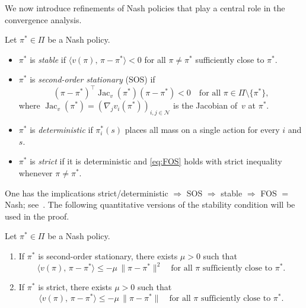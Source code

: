 \documentclass[a4paper,oneside,11pt]{report}
\newcommand{\calN}{\mathcal{N}}
\newcommand{\ip}[2]{\langle #1,\, #2 \rangle}
\newcommand{\norm}[1]{\| #1 \|}
\numberwithin{theorem}{chapter}
\numberwithin{equation}{chapter}
\begin{document}
We now introduce refinements of Nash policies that play a central role
in the convergence analysis.

\begin{definition}
  \label{def:refinements}
  Let $\pi^* \in \Pi$ be a Nash policy.
  \begin{itemize}
  \item $\pi^*$ is \emph{stable} if
    $\ip{v(\pi)}{\pi - \pi^*} < 0$ for all
    $\pi \ne \pi^*$ sufficiently close to $\pi^*$.
  \item $\pi^*$ is \emph{second-order stationary} (SOS) if
    \begin{equation}
      \label{eq:SOS}
      (\pi - \pi^*)^\top \operatorname{Jac}_v(\pi^*)(\pi - \pi^*) < 0
      \quad \text{for all } \pi \in \Pi \setminus \{\pi^*\},
      \tag{SOS}
    \end{equation}
    where
    $\operatorname{Jac}_v(\pi^*) = (\nabla_j v_i(\pi^*))_{i,j \in
      \calN}$ is the Jacobian of~$v$ at $\pi^*$.
  \item $\pi^*$ is \emph{deterministic} if $\pi^*_i(s)$ places all
    mass on a single action for every $i$ and $s$.
  \item $\pi^*$ is \emph{strict} if it is deterministic and
    \eqref{eq:FOS} holds with strict inequality whenever
    $\pi \ne \pi^*$.
  \end{itemize}
\end{definition}

One has the implications
strict/deterministic $\Longrightarrow$ SOS $\Longrightarrow$ stable
$\Longrightarrow$ FOS $=$ Nash; see~\cite[Proposition~1]{giannou2022}.
The following quantitative versions of the stability condition will be
used in the proof.

\begin{proposition}
  \label{prop:drift}
  Let $\pi^* \in \Pi$ be a Nash policy.
  \begin{enumerate}[label=\textup{(\alph*)}]
  \item If $\pi^*$ is second-order stationary, there exists $\mu > 0$
    such that
    \begin{equation}
      \label{eq:drift-SOS}
      \ip{v(\pi)}{\pi - \pi^*} \le -\mu\, \norm{\pi - \pi^*}^2
      \quad \text{for all } \pi \text{ sufficiently close to } \pi^*.
    \end{equation}
  \item If $\pi^*$ is strict, there exists $\mu > 0$ such that
    \begin{equation}
      \label{eq:drift-strict}
      \ip{v(\pi)}{\pi - \pi^*} \le -\mu\, \norm{\pi - \pi^*}
      \quad \text{for all } \pi \text{ sufficiently close to } \pi^*.
    \end{equation}
  \end{enumerate}
\end{proposition}
\end{document}
